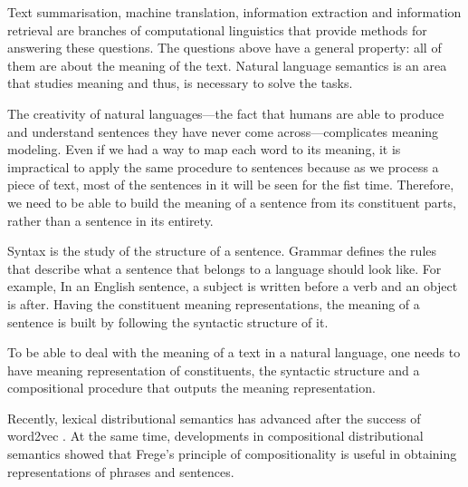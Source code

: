 Text summarisation, machine translation, information extraction and information retrieval are branches of computational linguistics that provide methods for answering these questions. The questions above have a general property: all of them are about the meaning of the text. Natural language semantics is an area that studies meaning and thus, is necessary to solve the tasks.

The creativity of natural languages---the fact that humans are able to produce
and understand sentences they have never come across---complicates meaning
modeling. Even if we had a way to map each word to its meaning, it is
impractical to apply the same procedure to sentences because as we process a
piece of text, most of the sentences in it will be seen for the fist time.
Therefore, we need to be able to build the meaning of a sentence from its
constituent parts, rather than a sentence in its entirety.
%
%

Syntax is the study of the structure of a sentence. Grammar defines the rules that describe what a sentence that belongs to a language should look like. For example, In an English sentence, a subject is written before a verb and an object is after. Having the constituent meaning representations, the meaning of a sentence is built by following the syntactic structure of it.

To be able to deal with the meaning of a text in a natural language, one needs to have meaning representation of constituents, the syntactic structure and a compositional procedure that outputs the meaning representation.

Recently, lexical distributional semantics \cite{BullinariaLevy2012,Bullinaria2007,Turney:2010:FMV:1861751.1861756} has advanced after the success of word2vec \cite{mikolov2013linguistic,mikolov2013distributed,mikolov2013efficient}. At the same time, developments in compositional distributional semantics \cite{mitchell2010composition,maillard-clark-grefenstette:2014:TTNLS,Grefenstette:2011:ESC:2145432.2145580,Grefenstette:2011:ETV:2140490.2140497,kartsadrqpl2014,fried-polajnar-clark:2015:ACL-IJCNLP} showed that Frege's principle of compositionality \cite{Janssen2001} is useful in obtaining representations of phrases and sentences.
%
%
%

